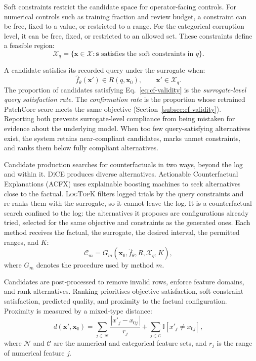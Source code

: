 \documentclass[final,5p,times,twocolumn]{elsarticle}
\begin{document}
Soft constraints restrict the candidate space for operator-facing
controls. For numerical controls such as training fraction and review
budget, a constraint can be free, fixed to a value, or restricted to a
range. For the categorical corruption level, it can be free, fixed, or
restricted to an allowed set. These constraints define a feasible
region:
\begin{equation}
    \mathcal{X}_{q} = \{\mathbf{x} \in \mathcal{X} :
    \mathbf{s} \text{ satisfies the soft constraints in } q\}.
    \label{eq:query-feasible-region}
\end{equation}

A candidate satisfies its recorded query under the surrogate when:
\begin{equation}
    \hat{f}_{\theta}(\mathbf{x}') \in R(q,\mathbf{x}_0),
    \qquad
    \mathbf{x}' \in \mathcal{X}_{q}.
    \label{eq:cf-validity}
\end{equation}
The proportion of candidates satisfying Eq.~\ref{eq:cf-validity} is the
\emph{surrogate-level query satisfaction rate}. The \emph{confirmation rate} is the proportion whose retrained PatchCore score meets the same
objective (Section~\ref{subsec:cf-validity}). Reporting both prevents
surrogate-level compliance from being mistaken for evidence about the
underlying model. When too few query-satisfying alternatives exist, the
system retains near-compliant candidates, marks unmet constraints, and
ranks them below fully compliant alternatives.

Candidate production searches for counterfactuals in two ways, beyond the log and within it. DiCE \cite{10.1145/3351095.3372850} produces diverse alternatives. Actionable Counterfactual Explanations (ACFX) \cite{bobek_acfx} uses explainable boosting machines to seek alternatives close to the factual. \textsc{LogTopK} filters logged trials by the query constraints and re-ranks them with the surrogate, so it cannot leave the log. It is a counterfactual search confined to the log: the alternatives it proposes are configurations already tried, selected for the same objective and constraints as the generated ones. Each method receives the factual, the
surrogate, the desired interval, the permitted ranges, and $K$:
\begin{equation}
    \mathcal{C}_{m} =
    G_{m}(\mathbf{x}_0, \hat{f}_{\theta}, R, \mathcal{X}_{q}, K),
    \label{eq:generator}
\end{equation}
where $G_m$ denotes the procedure used by method $m$.

Candidates are post-processed to remove invalid rows, enforce feature
domains, and rank alternatives. Ranking prioritises objective
satisfaction, soft-constraint satisfaction, predicted quality, and
proximity to the factual configuration. Proximity is measured by a
mixed-type distance:
\begin{equation}
    d(\mathbf{x}',\mathbf{x}_0)
    =
    \sum_{j \in \mathcal{N}}
    \frac{|x'_j - x_{0j}|}{r_j}
    +
    \sum_{j \in \mathcal{C}}
    \mathbb{I}[x'_j \neq x_{0j}],
    \label{eq:mixed-distance}
\end{equation}
where $\mathcal{N}$ and $\mathcal{C}$ are the numerical and categorical
feature sets, and $r_j$ is the range of numerical feature $j$.
\end{document}
